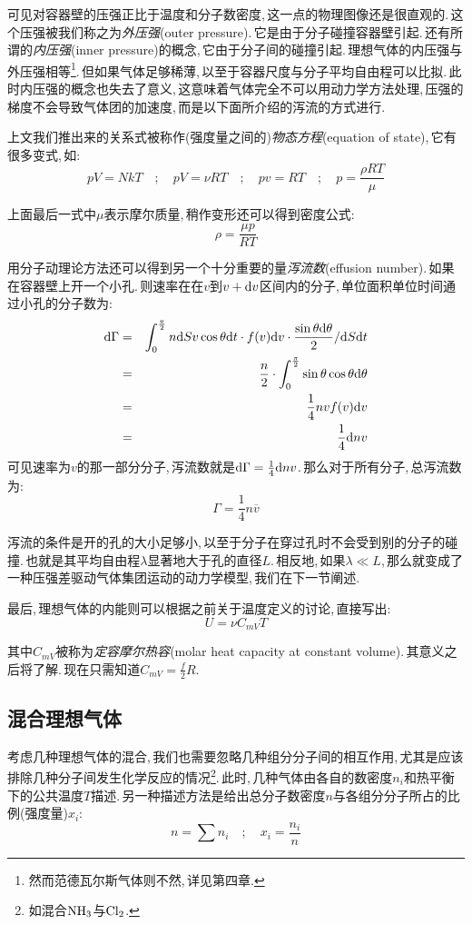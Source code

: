 可见对容器壁的压强正比于温度和分子数密度,\,这一点的物理图像还是很直观的.\,这个压强被我们称之为\emph{外压强}(outer pressure).\,它是由于分子碰撞容器壁引起.\,还有所谓的\emph{内压强}(inner pressure)的概念,\,它由于分子间的碰撞引起.\,理想气体的内压强与外压强相等\footnote{然而范德瓦尔斯气体则不然,\,详见第四章.}.\,但如果气体足够稀薄,\,以至于容器尺度与分子平均自由程可以比拟.\,此时内压强的概念也失去了意义,\,这意味着气体完全不可以用动力学方法处理,\,压强的梯度不会导致气体团的加速度,\,而是以下面所介绍的泻流的方式进行.

上文我们推出来的关系式被称作(强度量之间的)\emph{物态方程}(equation of state),\,它有很多变式,\,如:
\[pV=NkT \quad ; \quad pV=\nu RT \quad ; \quad pv=RT \quad ; \quad p=\frac{\rho RT}{\mu}\]

上面最后一式中$\mu$表示摩尔质量,\,稍作变形还可以得到密度公式:
\[\rho=\frac{\mu p}{RT}\]

用分子动理论方法还可以得到另一个十分重要的量\ca \emph{泻流数}(effusion number).\,如果在容器壁上开一个小孔.\,则速率在在$v$到$v+\textrm{d} v$区间内的分子,\,单位面积单位时间通过小孔的分子数为:
\begin{eqnarray*}
\textrm{d} \Gamma 		&=& 	\int_0^{\frac{\pi}{2}}n\textrm{d} S v\cos\theta\textrm{d} t \cdot f(v)\textrm{d} v \cdot\frac{\sin\theta\textrm{d}\theta}{2}/\textrm{d} S\textrm{d} t 	\\
				&=&		\frac{n}{2}\cdot \int_0^{\frac{\pi}{2}}\sin\theta\cos\theta\textrm{d}\theta	\\
				&=&		\frac{1}{4} nv f(v)\textrm{d} v 	\\
				&=&		\frac{1}{4}\textrm{d} n v
\end{eqnarray*}
可见速率为$v$的那一部分分子,\,泻流数就是$\textrm{d} \Gamma=\frac{1}{4} \textrm{d} nv$.\,那么对于所有分子,\,总泻流数为:
\[\Gamma=\frac{1}{4}n\overline{v}\]

泻流的条件是开的孔的大小足够小,\,以至于分子在穿过孔时不会受到别的分子的碰撞.\,也就是其平均自由程$\lambda$显著地大于孔的直径$L$.\,相反地,\,如果$\lambda\ll L$,\,那么就变成了一种压强差驱动气体集团运动的动力学模型,\,我们在下一节阐述.

最后,\,理想气体的内能则可以根据之前关于温度定义的讨论,\,直接写出:
\[U=\nu C_{mV} T\]

其中$C_{mV}$被称为\emph{定容摩尔热容}(molar heat capacity at constant volume).\,其意义之后将了解.\,现在只需知道$\displaystyle C_{mV}=\frac{f}{2}R$.

\subsection{混合理想气体}
考虑几种理想气体的混合,\,我们也需要忽略几种组分分子间的相互作用,\,尤其是应该排除几种分子间发生化学反应的情况\footnote{如混合{$\rm NH_3$}与{$\rm Cl_2$}.}.\,此时,\,几种气体由各自的数密度$n_i$和热平衡下的公共温度$T$描述.\,另一种描述方法是给出总分子数密度$n$与各组分分子所占的比例(强度量)$x_i$:
\[n=\sum n_i \quad ; \quad x_i=\frac{n_i}{n}\]

